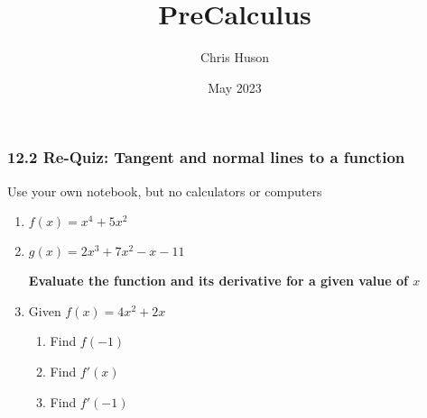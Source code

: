 \documentclass[12pt, twoside]{article}
\title{PreCalculus}
\author{Chris Huson}
\date{May 2023}
\begin{document}
\subsubsection*{12.2 Re-Quiz: Tangent and normal lines to a function}
Use your own notebook, but no calculators or computers

\begin{enumerate}

\subsubsection*{Find the derivative of each polynomial function}
\item $f(x)=x^4+5x^2$ \vspace{3cm}
\item $g(x)=2x^3+7x^2-x-11$ \par \vspace{3cm}

\textbf{Evaluate the function and its derivative for a given value of $x$}
\item Given $f(x)=4x^2+2x$
\begin{enumerate}[itemsep=2cm]
    \item Find $f(-1)$
    \item Find $f'(x)$
    \item Find $f'(-1)$
\end{enumerate} \vspace{2cm}


\end{enumerate}
\end{document}
